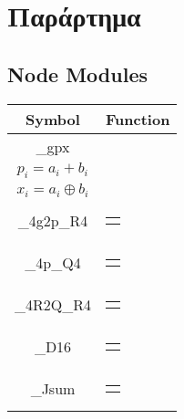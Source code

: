\section{Παράρτημα}

\subsection{Node Modules}
\label{appendix:Node_modules}
\begin{table}[H]
\centering
    \begin{tabularx}{\textwidth}{ | c | X | } 

    \hline
    Symbol & Function\\
    \hline
    
    \_gpx &
    \begin{tabular}{@{}c@{}}
        $g_i = a_i * b_i$\\
        $p_i = a_i + b_i$\\
        $x_i = a_i \oplus b_i $
    \end{tabular}\\\hline
    
    \_4g2p\_R4 &
    \begin{tabular}{@{}c@{}}
        $R = g_3 + g_2 + p_1g_1 + p_1p_0g_0$
    \end{tabular}\\\hline
    
    \_4p\_Q4 &
    \begin{tabular}{@{}c@{}}
        $Q = p_3 p_2 p_1 p_0$
    \end{tabular}\\\hline
    
    \_4R2Q\_R4 &
    \begin{tabular}{@{}c@{}}
        $R = R_3 + R_2 + Q_1R_1 + Q_1Q_0R_0$
    \end{tabular}\\\hline
    
    \_D16 &
    \begin{tabular}{@{}c@{}}
        $D = p_1R + p_0Q$
    \end{tabular}\\\hline
    
    \_Jsum &
    \begin{tabular}{@{}c@{}}
        $sum = R\ ?\ x\oplus D\ :\ x$
    \end{tabular}\\\hline
    

\end{tabularx}
\end{table}
